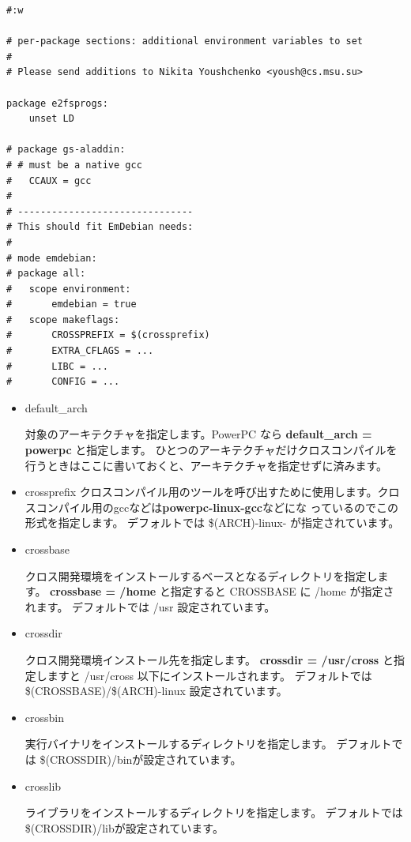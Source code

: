 \documentclass[mingoth]{jsarticle}
\begin{document}
{\begin{verbatim}
#:w

# per-package sections: additional environment variables to set
#
# Please send additions to Nikita Youshchenko <yoush@cs.msu.su>

package e2fsprogs:
    unset LD

# package gs-aladdin:
# # must be a native gcc
#   CCAUX = gcc
#
# -------------------------------
# This should fit EmDebian needs:
#
# mode emdebian:
# package all:
#   scope environment:
#       emdebian = true
#   scope makeflags:
#       CROSSPREFIX = $(crossprefix)
#       EXTRA_CFLAGS = ...
#       LIBC = ...
#       CONFIG = ...

\end{verbatim}
}


\begin{itemize}
\item default\_arch

	対象のアーキテクチャを指定します。PowerPC なら {\bf default\_arch = powerpc }と指定します。
	ひとつのアーキテクチャだけクロスコンパイルを行うときはここに書いておくと、アーキテクチャを指定せずに済みます。
	
\item crossprefix
	クロスコンパイル用のツールを呼び出すために使用します。クロスコンパイル用のgccなどは{\bf powerpc-linux-gcc}などにな
	っているのでこの形式を指定します。
	デフォルトでは \$(ARCH)-linux- が指定されています。

\item crossbase

	クロス開発環境をインストールするベースとなるディレクトリを指定します。
	{\bf crossbase = /home }と指定すると CROSSBASE に /home が指定されます。
	デフォルトでは /usr 設定されています。
	
\item crossdir 

	クロス開発環境インストール先を指定します。
	{\bf crossdir = /usr/cross }と指定しますと /usr/cross 以下にインストールされます。
	デフォルトでは \$(CROSSBASE)/\$(ARCH)-linux 設定されています。
	
\item crossbin

	実行バイナリをインストールするディレクトリを指定します。
	デフォルトでは \$(CROSSDIR)/binが設定されています。
	
\item crosslib

	ライブラリをインストールするディレクトリを指定します。
	デフォルトでは \$(CROSSDIR)/libが設定されています。
	

\end{itemize}
\end{document}
